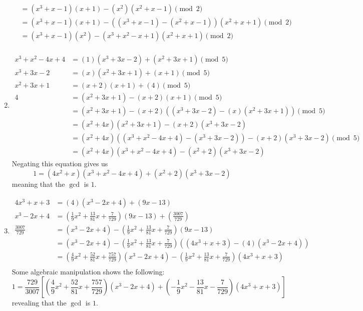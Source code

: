 \documentclass[12pt]{report}
\begin{document}
\begin{enumerate}[label=\alph*.]
\begin{align*}
        &= (x^3+x-1)(x+1) - (x^2)(x^2+x-1) \pmod{2} \\
        &= (x^3+x-1)(x+1) - ((x^3+x-1) -(x^2+x-1)) (x^2+x+1) \pmod{2} \\
        &= (x^3+x-1)(x^2) - (x^3+x^2-x+1)(x^2+x+1)\pmod{2} \\
    \end{align*}
    \item \begin{align*}
        x^3 + x^2 -4x + 4 &= (1)(x^3+3x-2)+(x^2+3x+1) \pmod{5} \\
        x^3 + 3x -2 &= (x)(x^2+3x+1) + (x+1) \pmod{5} \\
        x^2 + 3x + 1 &= (x+2)(x+1) + (4) \pmod{5} \\
        4 &= (x^2 + 3x +1) - (x+2)(x+1) \pmod{5} \\
        &= (x^2 + 3x +1) - (x+2)(( x^3 + 3x -2) - (x)(x^2+3x+1)) \pmod{5} \\
        &= (x^2 +4x)(x^2+3x+1) -(x+2)(x^3+3x-2) \\
        &= (x^2 +4x)((x^3 + x^2 -4x + 4) - (x^3+3x-2)) - (x+2)(x^3+3x-2)\pmod{5} \\
        &= (x^2 +4x)(x^3 + x^2 -4x + 4) - (x^2+2)(x^3+3x-2)
    \end{align*} 
    Negating this equation gives us 
    $$1 = (4x^2+x)(x^3+x^2-4x+4) + (x^2+2)(x^3+3x-2)$$
    meaning that the $\operatorname{gcd}$ is $1$.
    \item \begin{align*}
        4x^3 + x + 3 &= (4)(x^3 - 2 x + 4) + (9x-13) \\
        x^3 - 2 x + 4 &= \left(\frac{1}{9}x^2 + \frac{13}{81}x + \frac{7}{729}\right)(9x-13) + \left(\frac{3007}{729}\right) \\
        \frac{3007}{729} &= (x^3 - 2 x + 4) - \left(\frac{1}{9}x^2 + \frac{13}{81}x + \frac{7}{729}\right)(9x-13) \\
        &= (x^3 - 2 x + 4) - \left(\frac{1}{9}x^2 + \frac{13}{81}x + \frac{7}{729}\right)((4x^3 + x + 3) - (4)(x^3 - 2 x + 4))\\
        &= \left(\frac{4}{9}x^2 + \frac{52}{81}x + \frac{757}{729}\right)(x^3 - 2 x + 4) - \left(\frac{1}{9}x^2 + \frac{13}{81}x + \frac{7}{729}\right)(4x^3 + x + 3) \\
    \end{align*} 
    Some algebraic manipulation shows the following:
    $$1 = \frac{729}{3007}\left[ \left(\frac{4}{9}x^2 + \frac{52}{81}x + \frac{757}{729}\right)(x^3 - 2 x + 4) + \left(-\frac{1}{9}x^2 - \frac{13}{81}x - \frac{7}{729}\right)(4x^3 + x + 3)\right]$$
    revealing that the $\operatorname{gcd}$ is $1$.
\end{enumerate}
\end{document}
